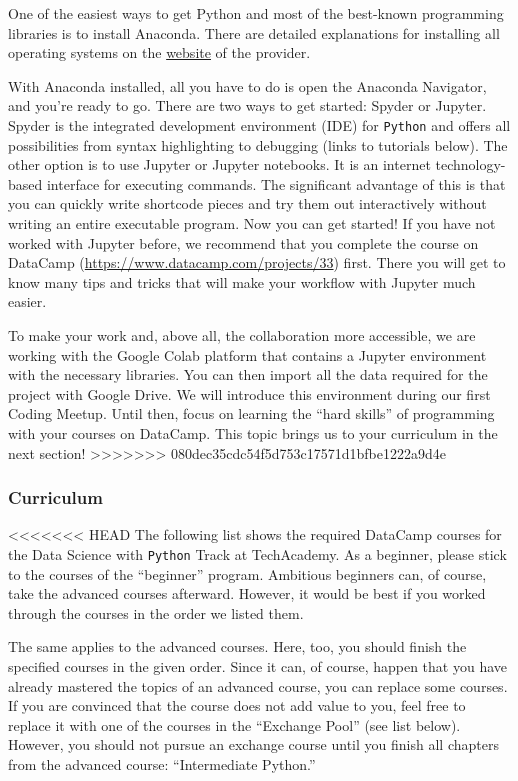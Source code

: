 \documentclass[
  11pt,
]{article}
\begin{document}
One of the easiest ways to get Python and most of the best-known programming libraries is to install Anaconda. There are detailed explanations for installing all operating systems on the \href{https://docs.anaconda.com/anaconda/install/}{website} of the provider.

With Anaconda installed, all you have to do is open the Anaconda Navigator, and you're ready to go. There are two ways to get started: Spyder or Jupyter. Spyder is the integrated development environment (IDE) for \texttt{Python} and offers all possibilities from syntax highlighting to debugging (links to tutorials below). The other option is to use Jupyter or Jupyter notebooks. It is an internet technology-based interface for executing commands. The significant advantage of this is that you can quickly write shortcode pieces and try them out interactively without writing an entire executable program.
Now you can get started! If you have not worked with Jupyter before, we recommend that you complete the course on DataCamp (\url{https://www.datacamp.com/projects/33}) first. There you will get to know many tips and tricks that will make your workflow with Jupyter much easier.

To make your work and, above all, the collaboration more accessible, we are working with the Google Colab platform that contains a Jupyter environment with the necessary libraries. You can then import all the data required for the project with Google Drive. We will introduce this environment during our first Coding Meetup. Until then, focus on learning the ``hard skills'' of programming with your courses on DataCamp. This topic brings us to your curriculum in the next section!
>>>>>>> 080dec35cdc54f5d753c17571d1bfbe1222a9d4e

\hypertarget{curriculum-1}{%
\subsubsection{Curriculum}\label{curriculum-1}}

<<<<<<< HEAD
The following list shows the required DataCamp courses for the Data Science with \texttt{Python} Track at TechAcademy.
As a beginner, please stick to the courses of the ``beginner'' program.
Ambitious beginners can, of course, take the advanced courses afterward.
However, it would be best if you worked through the courses in the order we listed them.

The same applies to the advanced courses.
Here, too, you should finish the specified courses in the given order.
Since it can, of course, happen that you have already mastered the topics of an advanced course, you can replace some courses.
If you are convinced that the course does not add value to you, feel free to replace it with one of the courses in the ``Exchange Pool'' (see list below).
However, you should not pursue an exchange course until you finish all chapters from the advanced course: ``Intermediate Python.''
\end{document}
